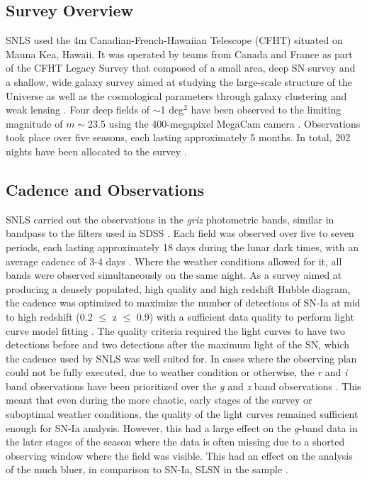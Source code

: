 \subsection{Survey Overview}
SNLS used the 4m Canadian-French-Hawaiian Telescope (CFHT) situated on Mauna Kea, Hawaii. It was operated by teams from Canada and France as part of the CFHT Legacy Survey that composed of a small area, deep SN survey and a shallow, wide galaxy survey aimed at studying the large-scale structure of the Universe as well as the cosmological parameters through galaxy clustering and weak lensing \citep{Pritchet2004,Astier2006}. Four deep fields of $\sim$1 deg$^2$ have been observed to the limiting magnitude of $m\sim$23.5 using the 400-megapixel MegaCam camera \citep{Boulade2003}. Observations took place over five seasons, each lasting approximately 5 months. In total, 202 nights have been allocated to the survey \citep{Pritchet2004}.

\subsection{Cadence and Observations}
SNLS carried out the observations in the \textit{griz} photometric bands, similar in bandpass to the filters used in SDSS . Each field was observed over five to seven periods, each lasting approximately 18 days during the lunar dark times, with an average cadence of 3-4 days \citep{Astier2006,Guy2010}. Where the weather conditions allowed for it, all bands were observed simultaneously on the same night. As a survey aimed at producing a densely populated, high quality and high redshift Hubble diagram, the cadence was optimized to maximize the number of detections of SN-Ia at mid to high redshift (0.2 $\leq$ z $\leq$ 0.9) with a sufficient data quality to perform light curve model fitting \citep{Pritchet2004}. The quality criteria required the light curves to have two detections before and two detections after the maximum light of the SN, which the cadence used by SNLS was well suited for. In cases where the observing plan could not be fully executed, due to weather condition or otherwise, the \textit{r} and \textit{i} band observations have been prioritized over the \textit{g} and \textit{z} band observations \citep{Guy2010}. This meant that even during the more chaotic, early stages of the survey or suboptimal weather conditions, the quality of the light curves remained sufficient enough for SN-Ia analysis. However, this had a large effect on the \textit{g}-band data in the later stages of the season where the data is often missing due to a shorted observing window where the field was visible. This had an effect on the analysis of the much bluer, in comparison to SN-Ia, SLSN in the sample \citep{Prajs2016}.

